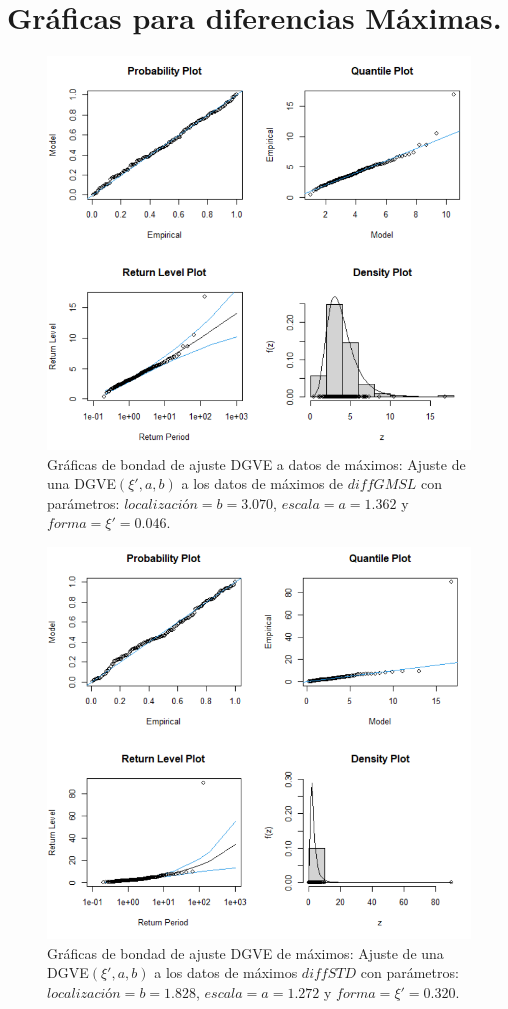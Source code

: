 \documentclass[10.5pt,notitlepage]{article}
\theoremstyle{plain}
\begin{document}
\section{Gráficas para diferencias Máximas.}
\begin{figure}[htb]
    \centering
    \includegraphics[scale = 0.4]{incisoc/DGVEaj.png}
    \caption{Gráficas de bondad de ajuste DGVE a datos de máximos: Ajuste de una DGVE\((\xi',a,b)\) a los datos de máximos  de \(diffGMSL\) con parámetros: \(localización=b = 3.070\), \(escala =a =  1.362 \) y \(forma = \xi'= 0.046\).}
    \label{fig:14.11}   
\end{figure}    

\begin{figure}[htb]
    \centering
    \includegraphics[scale = 0.4]{incisoc/DGVEajS.png}
    \caption{Gráficas de bondad de ajuste DGVE de máximos: Ajuste de una DGVE\((\xi',a,b)\) a los datos de máximos \(diffSTD\) con parámetros: \(localización=b = 1.828\), \(escala =a = 1.272\) y \(forma = \xi'=  0.320\).}
    \label{fig:14.12}    
\end{figure}        
\end{document}
